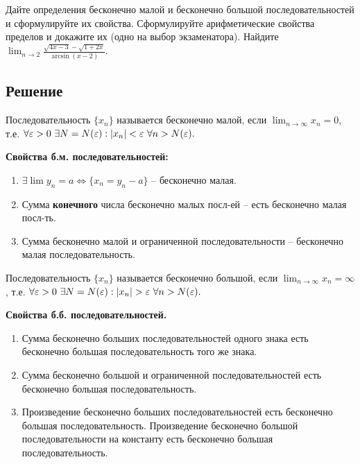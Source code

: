 Дайте определения бесконечно малой и бесконечно большой последовательностей и сформулируйте их свойства. Сформулируйте арифметические свойства пределов и докажите их (одно на
выбор экзаменатора). Найдите $\displaystyle \lim_{n\rightarrow 2} 
        \frac{
               \sqrt{4x - 3} -
               \sqrt{1 + 2x}
             }
             {
               \arcsin(x-2)
             }.$

\subsection*{Решение}

\begin{definition} Последовательность $ \{ x_ n \} $ называется бесконечно малой, 
    если $\displaystyle \lim_{n \rightarrow \infty} x_n = 0$, т.е. 
    $\forall \varepsilon > 0\ \exists N = N(\varepsilon):|x_n| < \varepsilon\ \forall n > N(\varepsilon).$
\end{definition}

\textbf{Свойства б.м. последовательностей:}
    \begin{enumerate}
        \item $\exists \lim y_n = a \Leftrightarrow \{x_n = y_n - a\}$ -- бесконечно малая.
        \item Сумма \textbf{конечного} числа бесконечно малых посл-ей -- есть бесконечно малая посл-ть.
        \item Сумма бесконечно малой и ограниченной последовательности -- бесконечно малая последовательность.
    \end{enumerate}

\begin{definition} Последовательность $ \{ x_ n \} $ называется бесконечно большой, 
    если $\displaystyle \lim_{n \rightarrow \infty} x_n = \infty$, т.е. 
    $\forall \varepsilon > 0\ \exists N = N(\varepsilon):|x_n| > \varepsilon\ \forall n > N(\varepsilon).$
\end{definition}
\textbf{Свойства б.б. последовательностей.}
    \begin{enumerate}
        \item Сумма бесконечно больших последовательностей одного знака есть бесконечно большая последовательность того же знака.
        \item Сумма бесконечно большой и ограниченной последовательностей есть бесконечно большая последовательность.
        \item Произведение бесконечно больших последовательностей есть бесконечно большая последовательность. Произведение бесконечно большой последовательности на константу есть бесконечно большая последовательность.
    \end{enumerate}

